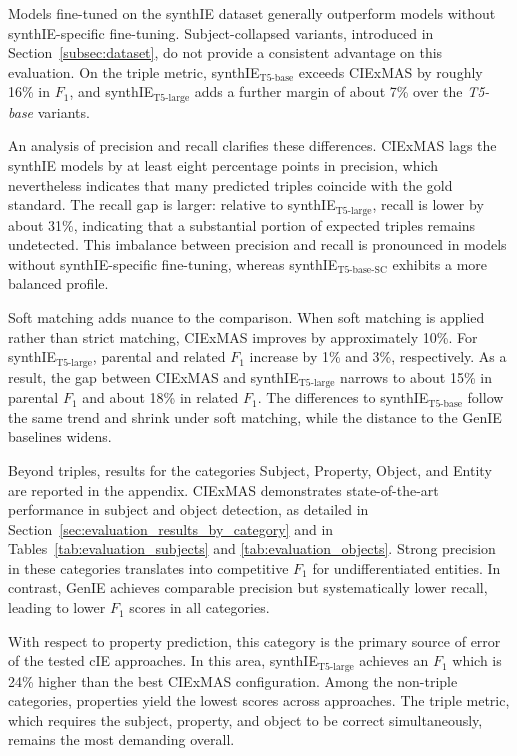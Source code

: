 \documentclass[a4paper,oneside,bibliography=totoc]{scrbook}
\begin{document}
Models fine-tuned on the synthIE dataset generally outperform models without synthIE-specific fine-tuning. Subject-collapsed variants, introduced in Section~\ref{subsec:dataset}, do not provide a consistent advantage on this evaluation. On the triple metric, synthIE$_{\text{T5-base}}$ exceeds CIExMAS by roughly 16\% in $F_1$, and synthIE$_{\text{T5-large}}$ adds a further margin of about 7\% over the \textit{T5-base} variants.

An analysis of precision and recall clarifies these differences. CIExMAS lags the synthIE models by at least eight percentage points in precision, which nevertheless indicates that many predicted triples coincide with the gold standard. The recall gap is larger: relative to synthIE$_{\text{T5-large}}$, recall is lower by about 31\%, indicating that a substantial portion of expected triples remains undetected. This imbalance between precision and recall is pronounced in models without synthIE-specific fine-tuning, whereas synthIE$_{\text{T5-base-SC}}$ exhibits a more balanced profile.

Soft matching adds nuance to the comparison. When soft matching is applied rather than strict matching, CIExMAS improves by approximately 10\%. For synthIE$_{\text{T5-large}}$, parental and related $F_1$ increase by 1\% and 3\%, respectively. As a result, the gap between CIExMAS and synthIE$_{\text{T5-large}}$ narrows to about 15\% in parental $F_1$ and about 18\% in related $F_1$. The differences to synthIE$_{\text{T5-base}}$ follow the same trend and shrink under soft matching, while the distance to the GenIE baselines widens.

Beyond triples, results for the categories Subject, Property, Object, and Entity are reported in the appendix. CIExMAS demonstrates state-of-the-art performance in subject and object detection, as detailed in Section~\ref{sec:evaluation_results_by_category} and in Tables~\ref{tab:evaluation_subjects} and \ref{tab:evaluation_objects}. Strong precision in these categories translates into competitive $F_1$ for undifferentiated entities. In contrast, GenIE achieves comparable precision but systematically lower recall, leading to lower $F_1$ scores in all categories.

With respect to property prediction, this category is the primary source of error of the tested \ac{cIE} approaches. In this area, synthIE$_{\text{T5-large}}$ achieves an $F_1$ which is 24\% higher than the best CIExMAS configuration. Among the non-triple categories, properties yield the lowest scores across approaches. The triple metric, which requires the subject, property, and object to be correct simultaneously, remains the most demanding overall.
\end{document}
